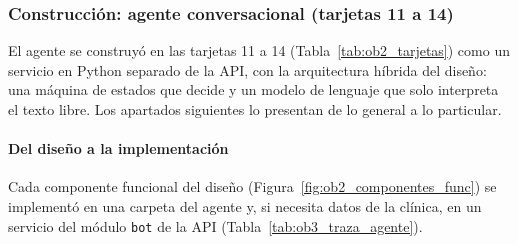 
\subsubsection{Construcción: agente conversacional (tarjetas 11 a 14)}

El agente se construyó en las tarjetas 11 a 14 (Tabla~\ref{tab:ob2_tarjetas}) como un servicio en Python separado de la API, con la arquitectura híbrida del diseño: una máquina de estados que decide y un modelo de lenguaje que solo interpreta el texto libre. Los apartados siguientes lo presentan de lo general a lo particular.

\paragraph{Del diseño a la implementación}

Cada componente funcional del diseño (Figura~\ref{fig:ob2_componentes_func}) se implementó en una carpeta del agente y, si necesita datos de la clínica, en un servicio del módulo \texttt{bot} de la API (Tabla~\ref{tab:ob3_traza_agente}).

